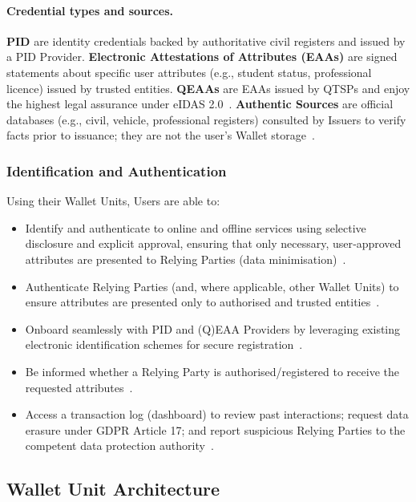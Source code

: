 \documentclass[sigconf,balance,nonacm,authordraft]{acmart}
\begin{document}
\paragraph{Credential types and sources.}
\textbf{PID} are identity credentials backed by authoritative civil registers and issued by a PID Provider. 
\textbf{Electronic Attestations of Attributes (EAAs)} are signed statements about specific user attributes (e.g., student status, professional licence) issued by trusted entities. 
\textbf{QEAAs} are EAAs issued by QTSPs and enjoy the highest legal assurance under eIDAS 2.0~\cite{EU_eIDAS2024}. 
\textbf{Authentic Sources} are official databases (e.g., civil, vehicle, professional registers) consulted by Issuers to verify facts prior to issuance; they are not the user's Wallet storage~\cite{EU_ARF2024}.

\subsubsection*{Identification and Authentication}
Using their Wallet Units, Users are able to:
\begin{itemize}
  \item Identify and authenticate to online and offline services using selective disclosure and explicit approval, ensuring that only necessary, user‑approved attributes are presented to Relying Parties (data minimisation)~\cite{EU_ARF2024}.
  \item Authenticate Relying Parties (and, where applicable, other Wallet Units) to ensure attributes are presented only to authorised and trusted entities~\cite{EU_ARF2024}.
  \item Onboard seamlessly with PID and (Q)EAA Providers by leveraging existing electronic identification schemes for secure registration~\cite{EU_ARF2024}.
  \item Be informed whether a Relying Party is authorised/registered to receive the requested attributes~\cite{EU_ARF2024}.
  \item Access a transaction log (dashboard) to review past interactions; request data erasure under GDPR Article 17; and report suspicious Relying Parties to the competent data protection authority~\cite{EU_ARF2024,EU_eIDAS2024}.
\end{itemize}



\subsection{Wallet Unit Architecture}
\end{document}
